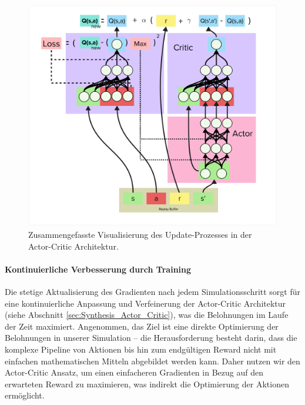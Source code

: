 \begin{figure}[htbp]
    \centering
		\includegraphics[width=\linewidth, trim=10px 10px 10px 10px, clip]{3Experiment/2Experiment/5Actor_Critick.png}
    \caption{Zusammengefasste Visualisierung des Update-Prozesses in der Actor-Critic Architektur.}
    \label{fig:ActorCriticSynthesis}
\end{figure}


\paragraph{Kontinuierliche Verbesserung durch Training}
Die stetige Aktualisierung des Gradienten nach jedem Simulationsschritt sorgt für eine kontinuierliche Anpassung und Verfeinerung der Actor-Critic Architektur (siehe Abschnitt \ref{sec:Synthesis_Actor_Critic}), was die Belohnungen im Laufe der Zeit maximiert. Angenommen, das Ziel ist eine direkte Optimierung der Belohnungen in unserer Simulation – die Herausforderung besteht darin, dass die komplexe Pipeline von Aktionen bis hin zum endgültigen Reward nicht mit einfachen mathematischen Mitteln abgebildet werden kann. Daher nutzen wir den Actor-Critic Ansatz, um einen einfacheren Gradienten in Bezug auf den erwarteten Reward zu maximieren, was indirekt die Optimierung der Aktionen ermöglicht.


 
